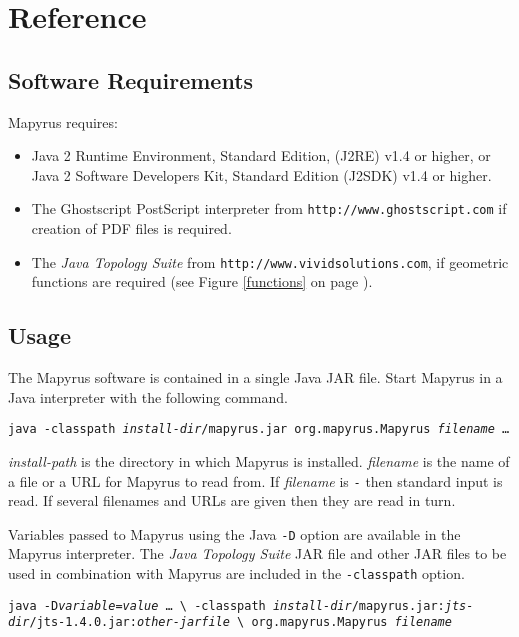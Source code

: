 
\section{Reference}

\subsection{Software Requirements}

Mapyrus requires:
\begin{itemize}
\item
Java 2 Runtime Environment, Standard Edition, (J2RE) v1.4 or higher,
or Java 2 Software Developers Kit, Standard Edition (J2SDK) v1.4 or higher.
\item
The Ghostscript PostScript interpreter from 
\texttt{http://www.ghostscript.com}
if creation of PDF files is required.
\item
The \textit{Java Topology Suite} from \texttt{http://www.vividsolutions.com},
if geometric functions are required
(see Figure \ref{functions} on page \pageref{functions}).
\end{itemize}

\subsection{Usage}

The Mapyrus software is contained in a single Java JAR file.
Start Mapyrus in a Java interpreter with the following command.

\vspace{10pt}
\texttt{java -classpath \textit{install-dir}/mapyrus.jar org.mapyrus.Mapyrus \textit{filename} \dots}
\vspace{10pt}

\textit{install-path} is the directory in which
Mapyrus is installed.  \textit{filename} is the name of a file
or a URL for Mapyrus to read from.  If \textit{filename} is \texttt{-}
then standard input is read.  If several filenames and URLs are
given then they are read in turn.

Variables passed to Mapyrus using the Java \texttt{-D} option
are available in the Mapyrus interpreter.  The
\textit{Java Topology Suite} JAR file and other JAR files
to be used in combination with Mapyrus are included in the
\texttt{-classpath} option.

\begin{alltt}
\texttt{java -D\textit{variable}=\textit{value} \dots\ \textbackslash
  -classpath \textit{install-dir}/mapyrus.jar:\textit{jts-dir}/jts-1.4.0.jar:\textit{other-jarfile} \textbackslash
  org.mapyrus.Mapyrus \textit{filename}}
\end{alltt}

